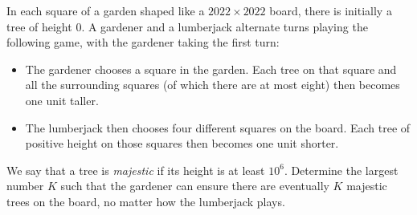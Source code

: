 In each square of a garden shaped like a $2022 \times 2022$ board, there is initially a tree of height $0$. A gardener and a lumberjack alternate turns playing the following game, with the gardener taking the first turn:

\begin{itemize}
\item The gardener chooses a square in the garden. Each tree on that square and all the surrounding squares (of which there are at most eight) then becomes one unit taller.
\item The lumberjack then chooses four different squares on the board. Each tree of positive height on those squares then becomes one unit shorter.
\end{itemize}

We say that a tree is \emph{majestic} if its height is at least $10^6$. Determine the largest number $K$ such that the gardener can ensure there are eventually $K$ majestic trees on the board, no matter how the lumberjack plays.
